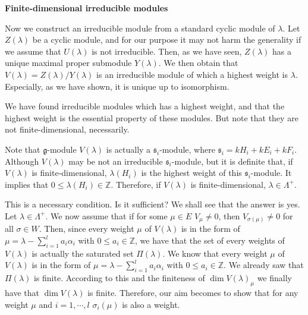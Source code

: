 \documentclass{article}
\newcommand{\InZ}{\mathbb{Z}}
\newcommand{\lie}[1]{\mathfrak{#1}}
\begin{document}
\newpage

\textbf{Finite-dimensional irreducible modules}

Now we construct an irreducible module from a standard cyclic module of $\lambda$.
Let $Z(\lambda)$ be a cyclic module, and for our purpose it may not harm the generality if we assume that $U(\lambda)$ is not irreducible.
Then, as we have seen, $Z(\lambda)$ has a unique maximal proper submodule $Y(\lambda)$.
We then obtain that $V(\lambda) = Z(\lambda) / Y(\lambda)$ is an irreducible module of which a highest weight is $\lambda$.
Especially, as we have shown, it is unique up to isomorphism.

We have found irreducible modules which has a highest weight, and that the highest weight is the essential property of these modules.
But note that they are not finite-dimensional, necessarily.

Note that $\lie{g}$-module $V(\lambda)$ is actually a $\lie{s}_i$-module, where $\lie{s}_i = kH_i + kE_i + kF_i$.
Although $V(\lambda)$ may be not an irreducible $\lie{s}_i$-module, but it is definite that, if $V(\lambda)$ is finite-dimensional, $\lambda(H_i)$ is the highest weight of this $\lie{s}_i$-module.
It implies that $0 \le \lambda(H_i) \in \InZ$.
Therefore, if $V(\lambda)$ is finite-dimensional, $\lambda \in \Lambda^+$.

This is a necessary condition.
Is it sufficient?
We shall see that the answer is yes.
Let $\lambda \in \Lambda^+$.
We now assume that if for some $\mu \in E$ $V_\mu \ne 0$, then $V_{\sigma(\mu)} \ne 0$ for all $\sigma \in W$.
Then, since every weight $\mu$ of $V(\lambda)$ is in the form of $\mu = \lambda - \sum_{i = 1}^l a_i \alpha_i$ with $0 \le a_i \in \InZ$, we have that the set of every weights of $V(\lambda)$ is actually the saturated set $\Pi(\lambda)$.
We know that every weight $\mu$ of $V(\lambda)$ is in the form of $\mu = \lambda - \sum_{i = 1}^l a_i \alpha_i$ with $0 \le a_i \in \InZ$.
We already saw that $\Pi(\lambda)$ is finite.
According to this and the finiteness of $\dim{V(\lambda)_\mu}$ we finally have that $\dim{V(\lambda)}$ is finite.
Therefore, our aim becomes to show that for any weight $\mu$ and $i= 1, \cdots, l$ $\sigma_i(\mu)$ is also a weight.
\end{document}
